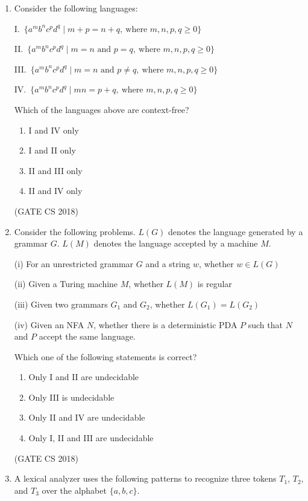 \documentclass[12pt]{article}
\begin{document}
\begin{enumerate}
\item Consider the following languages:

I.\ $\{a^m b^n c^p d^q \mid m+p = n+q,\ \text{where } m,n,p,q \ge 0\}$

II.\ $\{a^m b^n c^p d^q \mid m = n \text{ and } p = q,\ \text{where } m,n,p,q \ge 0\}$

III.\ $\{a^m b^n c^p d^q \mid m = n \text{ and } p \ne q,\ \text{where } m,n,p,q \ge 0\}$

IV.\ $\{a^m b^n c^p d^q \mid mn = p + q,\ \text{where } m,n,p,q \ge 0\}$

Which of the languages above are context-free?
\begin{multicols}{2}
\begin{enumerate}
\item I and IV only
\item I and II only
\item II and III only
\item II and IV only
\end{enumerate}
\end{multicols}
(GATE CS 2018)

\item Consider the following problems. $L(G)$ denotes the language generated by a grammar $G$. $L(M)$ denotes the language accepted by a machine $M$.

(i) For an unrestricted grammar $G$ and a string $w$, whether $w \in L(G)$

(ii) Given a Turing machine $M$, whether $L(M)$ is regular

(iii) Given two grammars $G_1$ and $G_2$, whether $L(G_1)=L(G_2)$

(iv) Given an NFA $N$, whether there is a deterministic PDA $P$ such that $N$ and $P$ accept the same language.

Which one of the following statements is correct?
\begin{multicols}{2}
\begin{enumerate}
\item Only I and II are undecidable
\item Only III is undecidable
\item Only II and IV are undecidable
\item Only I, II and III are undecidable
\end{enumerate}
\end{multicols}
(GATE CS 2018)

\item A lexical analyzer uses the following patterns to recognize three tokens $T_1$, $T_2$, and $T_3$ over the alphabet $\{a,b,c\}$.


\end{enumerate}
\end{document}
